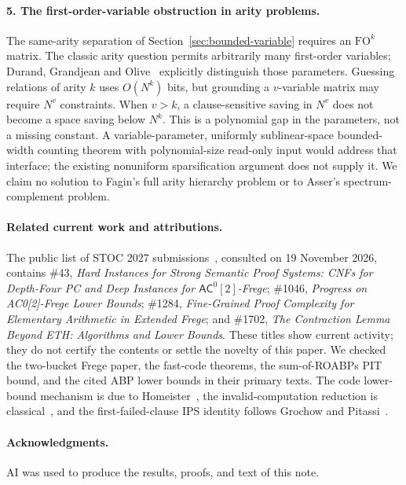 \documentclass[11pt]{article}
\theoremstyle{definition}
\theoremstyle{remark}
\begin{document}
\paragraph{5. The first-order-variable obstruction in arity problems.}
The same-arity separation of Section~\ref{sec:bounded-variable}
requires an $\mathrm{FO}^k$ matrix. The classic arity question permits
arbitrarily many first-order variables; Durand, Grandjean and
Olive~\cite[Introduction, pp.~1--2]{DGO04} explicitly distinguish
those parameters. Guessing relations of arity $k$ uses $O(N^k)$ bits,
but grounding a $v$-variable matrix may require $N^v$ constraints.
When $v>k$, a clause-sensitive saving in $N^v$ does not become a
space saving below $N^k$. This is a polynomial gap in the parameters,
not a missing constant. A variable-parameter, uniformly sublinear-space
bounded-width counting theorem with polynomial-size read-only input
would address that interface; the existing nonuniform
sparsification argument does not supply it. We claim no solution to
Fagin's full arity hierarchy problem or to Asser's spectrum-complement
problem.

\paragraph{Related current work and attributions.}
The public list of STOC 2027 submissions~\cite{STOC27}, consulted on
19 November 2026, contains \#43, \emph{Hard Instances for Strong
Semantic Proof Systems: CNFs for Depth-Four PC and Deep Instances for
$\mathsf{AC}^0[2]$-Frege}; \#1046, \emph{Progress on AC0[2]-Frege Lower
Bounds}; \#1284, \emph{Fine-Grained Proof Complexity for Elementary
Arithmetic in Extended Frege}; and \#1702, \emph{The Contraction Lemma
Beyond ETH: Algorithms and Lower Bounds}. These titles show current
activity; they do not certify the contents or settle the novelty of
this paper. We checked the two-bucket Frege paper, the fast-code
theorems, the sum-of-ROABPs PIT bound, and the cited ABP lower bounds
in their primary texts. The code lower-bound mechanism is due to
Homeister~\cite{Homeister03}, the invalid-computation reduction is
classical~\cite{GS05}, and the first-failed-clause IPS identity follows
Grochow and Pitassi~\cite{GP18}.

\paragraph{Acknowledgments.}
AI was used to produce the results, proofs, and text of this note.
\end{document}
